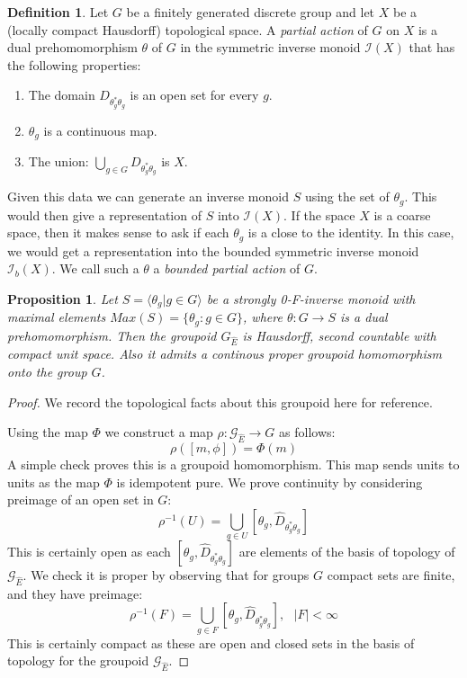 \documentclass[11pt]{amsart}
\theoremstyle{plain}
\newtheorem{proposition}[theorem]{Proposition}%
\theoremstyle{definition}%
\newtheorem{definition}[theorem]{Definition}%
\theoremstyle{remark}%
\newcommand{\G}{\mathcal{G}}
\newcommand{\E}{\widehat{E}}
\begin{document}
\begin{definition}
Let $G$ be a finitely generated discrete group and let $X$ be a (locally compact Hausdorff) topological space. A \textit{partial action} of $G$ on $X$ is a dual prehomomorphism $\theta$ of $G$ in the symmetric inverse monoid $\mathcal{I}(X)$ that has the following properties:
\begin{enumerate}
\item The domain $D_{\theta_{g}^{*}\theta_{g}}$ is an open set for every $g$.
\item $\theta_{g}$ is a continuous map.
\item The union: $\bigcup_{g \in G}D_{\theta_{g}^{*}\theta_{g}}$ is $X$.
\end{enumerate}
\end{definition}

Given this data we can generate an inverse monoid $S$ using the set of $\theta_{g}$. This would then give a representation of $S$ into $\mathcal{I}(X)$. If the space $X$ is a coarse space, then it makes sense to ask if each $\theta_{g}$ is a close to the identity. In this case, we would get a representation into the bounded symmetric inverse monoid $\mathcal{I}_{b}(X)$. We call such a $\theta$ a \textit{bounded partial action} of $G$.

\begin{proposition}\label{Prop:GrpoidHom}
Let $S = \langle \theta_{g} | g \in G \rangle$ be a strongly 0-F-inverse monoid with maximal elements $Max(S)= \lbrace \theta_{g}:g \in G \rbrace$, where $\theta: G \rightarrow S$ is a dual prehomomorphism. Then the groupoid $G_{\E}$ is Hausdorff, second countable with compact unit space. Also it admits a continous proper groupoid homomorphism onto the group $G$.
\end{proposition}
\begin{proof}
We record the topological facts about this groupoid here for reference.

Using the map $\Phi$ we construct a map $\rho: \G_{\E} \rightarrow G$ as follows:
\begin{equation*}
\rho([m,\phi]) = \Phi(m)
\end{equation*}
A simple check proves this is a groupoid homomorphism. This map sends units to units as the map $\Phi$ is idempotent pure. We prove continuity by considering preimage of an open set in $G$:
\begin{equation*}
\rho^{-1}(U)=\bigcup_{g \in U}[\theta_{g},\widehat{D}_{\theta^{*}_{g}\theta_{g}}]
\end{equation*}
This is certainly open as each $[\theta_{g},\widehat{D}_{\theta^{*}_{g}\theta_{g}}]$ are elements of the basis of topology of $\G_{\E}$. We check it is proper by observing that for groups $G$ compact sets are finite, and they have preimage:
\begin{equation*}
\rho^{-1}(F)=\bigcup_{g \in F}[\theta_{g},\widehat{D}_{\theta^{*}_{g}\theta_{g}}], \mbox{ } \vert F \vert < \infty 
\end{equation*}
This is certainly compact as these are open and closed sets in the basis of topology for the groupoid $\G_{\E}$.\end{proof}
\end{document}
